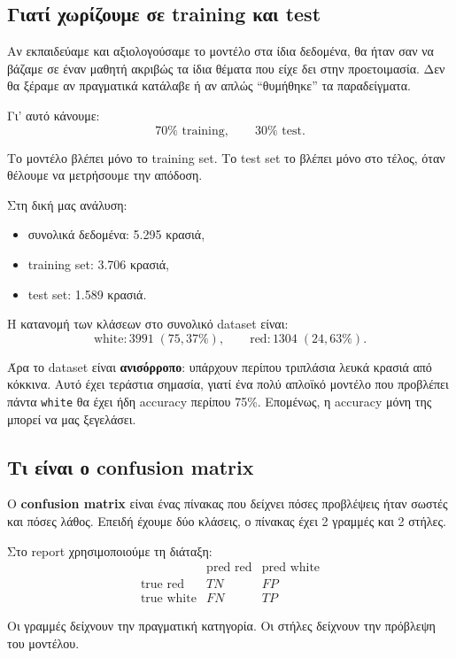 \documentclass[11pt,a4paper]{article}
\newcommand{\code}[1]{\texttt{#1}}
\begin{document}
\subsection{Γιατί χωρίζουμε σε training και test}

Αν εκπαιδεύαμε και αξιολογούσαμε το μοντέλο στα ίδια δεδομένα, θα ήταν σαν να
βάζαμε σε έναν μαθητή ακριβώς τα ίδια θέματα που είχε δει στην προετοιμασία.
Δεν θα ξέραμε αν πραγματικά κατάλαβε ή αν απλώς ``θυμήθηκε'' τα παραδείγματα.

Γι' αυτό κάνουμε:
\[
70\% \text{ training}, \qquad 30\% \text{ test}.
\]

Το μοντέλο βλέπει μόνο το training set. Το test set το βλέπει μόνο στο τέλος,
όταν θέλουμε να μετρήσουμε την απόδοση.

Στη δική μας ανάλυση:
\begin{itemize}
    \item συνολικά δεδομένα: 5.295 κρασιά,
    \item training set: 3.706 κρασιά,
    \item test set: 1.589 κρασιά.
\end{itemize}

Η κατανομή των κλάσεων στο συνολικό dataset είναι:
\[
\text{white}: 3991 \; (75{,}37\%), \qquad
\text{red}: 1304 \; (24{,}63\%).
\]

Άρα το dataset είναι \textbf{ανισόρροπο}: υπάρχουν περίπου τριπλάσια λευκά
κρασιά από κόκκινα. Αυτό έχει τεράστια σημασία, γιατί ένα πολύ απλοϊκό
μοντέλο που προβλέπει πάντα \code{white} θα έχει ήδη accuracy περίπου 75\%.
Επομένως, η accuracy μόνη της μπορεί να μας ξεγελάσει.

\subsection{Τι είναι ο confusion matrix}

Ο \textbf{confusion matrix} είναι ένας πίνακας που δείχνει πόσες προβλέψεις
ήταν σωστές και πόσες λάθος. Επειδή έχουμε δύο κλάσεις, ο πίνακας έχει 2
γραμμές και 2 στήλες.

Στο report χρησιμοποιούμε τη διάταξη:
\[
\begin{array}{c|cc}
 & \text{pred red} & \text{pred white} \\
\hline
\text{true red} & TN & FP \\
\text{true white} & FN & TP
\end{array}
\]

Οι γραμμές δείχνουν την πραγματική κατηγορία. Οι στήλες δείχνουν την
πρόβλεψη του μοντέλου.
\end{document}
